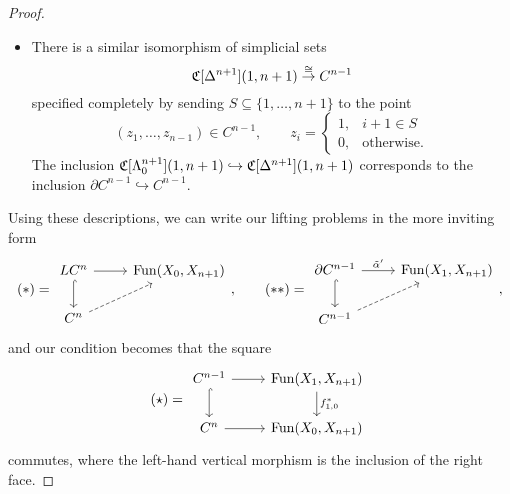 \documentclass[main.tex]{subfiles}
\begin{document}
\begin{proof}
\begin{itemize}
    \item There is a similar isomorphism of simplicial sets
      \begin{equation*}
        \mathfrak{C}[\Delta^{n+1}](1, n+1) \overset{\cong}{\to} C^{n-1}
      \end{equation*}
      specified completely by sending $S \subseteq \{1, \ldots, n+1\}$ to the point
      \begin{equation*}
        (z_{1}, \ldots, z_{n-1}) \in C^{n-1},\qquad z_{i} =
        \begin{cases}
          1, & i+1 \in S \\
          0, &\text{otherwise.}
        \end{cases}
      \end{equation*}
      The inclusion $\mathfrak{C}[\Lambda^{n+1}_{0}](1, n+1) \hookrightarrow \mathfrak{C}[\Delta^{n+1}](1, n+1)$ corresponds to the inclusion $\partial C^{n-1} \hookrightarrow C^{n-1}$.
  \end{itemize}

  Using these descriptions, we can write our lifting problems in the more inviting form
  \begin{equation*}
    (*) =
    \begin{tikzcd}
      LC^{n}
      \arrow[r]
      \arrow[d, hook]
      & \Fun(X_{0}, X_{n+1})
      \\
      C^{n}
      \arrow[ur, dashed]
    \end{tikzcd},\qquad (**) =
    \begin{tikzcd}
      \partial C^{n-1}
      \arrow[r, "\tilde{\alpha}'"]
      \arrow[d, hook]
      & \Fun(X_{1}, X_{n+1})
      \\
      C^{n-1}
      \arrow[ur, dashed]
    \end{tikzcd},
  \end{equation*}
  and our condition becomes that the square
  \begin{equation*}
    (\star) =
    \begin{tikzcd}
      C^{n-1}
      \arrow[r]
      \arrow[d, hook]
      & \Fun(X_{1}, X_{n+1})
      \arrow[d, "f_{1,0}^{*}"]
      \\
      C^{n}
      \arrow[r]
      & \Fun(X_{0}, X_{n+1})
    \end{tikzcd}
  \end{equation*}
  commutes, where the left-hand vertical morphism is the inclusion of the right face.


\end{proof}
\end{document}
